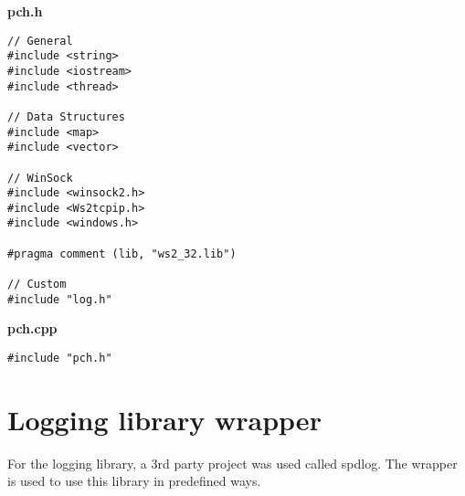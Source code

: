 \textbf{pch.h}
\begin{lstlisting}
// General
#include <string>
#include <iostream>
#include <thread>

// Data Structures
#include <map>
#include <vector>

// WinSock
#include <winsock2.h>
#include <Ws2tcpip.h>
#include <windows.h>

#pragma comment (lib, "ws2_32.lib")

// Custom
#include "log.h"
\end{lstlisting}

\textbf{pch.cpp}
\begin{lstlisting}
#include "pch.h"
\end{lstlisting}







\section{Logging library wrapper}
For the logging library, a 3rd party project was used called spdlog. The wrapper is used to use this library in predefined ways.


